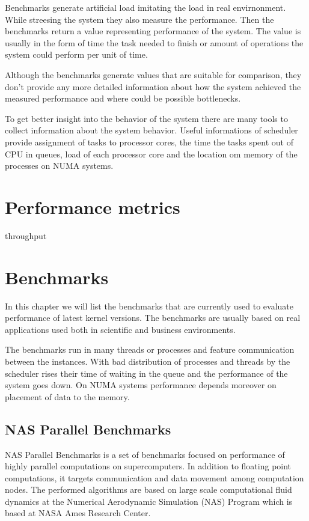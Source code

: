 Benchmarks generate artificial load imitating the load in real envirnonment.
While streesing the system they also measure the performance. Then the
benchmarks return a value representing performance of the system. The value is
usually in the form of time the task needed to finish or amount of operations
the system could perform per unit of time.

Although the benchmarks generate values that are suitable for comparison, they
don't provide any more detailed information about how the system achieved the
measured performance and where could be possible bottlenecks.

To get better insight into the behavior of the system there are many tools to
collect information about the system behavior. Useful informations of scheduler
provide assignment of tasks to processor cores, the time the tasks spent out of
CPU in queues, load of each processor core and the location om memory of the
processes on NUMA systems. 

\section{Performance metrics}
throughput

\section{Benchmarks}
In this chapter we will list the benchmarks that are currently used to evaluate
performance of latest kernel versions. The benchmarks are usually based on real
applications used both in scientific and business environments.

The benchmarks run in many threads or processes and feature communication
between the instances. With bad distribution of processes and threads by the
scheduler rises their time of waiting in the queue and the performance of the
system goes down. On NUMA systems performance depends moreover on placement of
data to the memory.

\subsection{NAS Parallel Benchmarks}
NAS Parallel Benchmarks is a set of benchmarks focused on performance of highly
parallel computations on supercomputers. In addition to floating point
computations, it targets communication and data movement among computation
nodes. The performed algorithms are based on large scale computational fluid
dynamics at the Numerical Aerodynamic Simulation (NAS) Program which is based at
NASA Ames Research Center.

